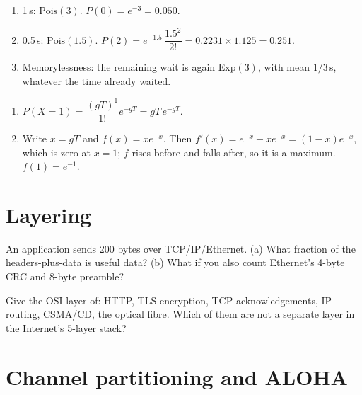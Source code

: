 \begin{enumerate}
  \item[(a)] 1\,s: $\text{Pois}(3)$. $P(0)=e^{-3}=0.050$.
  \item[(b)] 0.5\,s: $\text{Pois}(1.5)$. $P(2)=e^{-1.5}\,\dfrac{1.5^2}{2!}=0.2231\times1.125=0.251$.
  \item[(c)] Memorylessness: the remaining wait is again $\text{Exp}(3)$, with mean $1/3$\,s, whatever the time already waited.
\end{enumerate}

\begin{enumerate}
  \item[(a)] $P(X=1)=\dfrac{(gT)^1}{1!}e^{-gT}=gT\,e^{-gT}$.
  \item[(b)] Write $x=gT$ and $f(x)=xe^{-x}$. Then $f'(x)=e^{-x}-xe^{-x}=(1-x)e^{-x}$, which is zero at $x=1$; $f$ rises before and falls after, so it is a maximum. $f(1)=e^{-1}$.
\end{enumerate}


\section{Layering}

An application sends 200 bytes over TCP/IP/Ethernet. (a) What fraction of the headers-plus-data is useful data? (b) What if you also count Ethernet's 4-byte CRC and 8-byte preamble?

Give the OSI layer of: HTTP, TLS encryption, TCP acknowledgements, IP routing, CSMA/CD, the optical fibre. Which of them are not a separate layer in the Internet's 5-layer stack?

\section{Channel partitioning and ALOHA}

